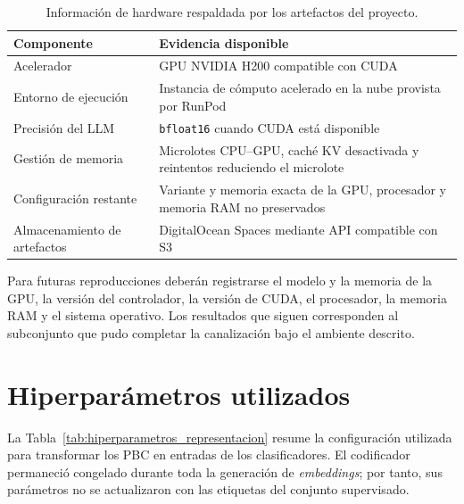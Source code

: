 \begin{table}[H]
\centering
\caption{Información de hardware respaldada por los artefactos del proyecto.}
\label{tab:hardware}
\begin{tabular}{p{4.2cm}p{8.2cm}}
\toprule
\textbf{Componente} & \textbf{Evidencia disponible} \\
\midrule
Acelerador & GPU NVIDIA H200 compatible con CUDA \\
Entorno de ejecución & Instancia de cómputo acelerado en la nube provista por RunPod \\
Precisión del LLM & \texttt{bfloat16} cuando CUDA está disponible \\
Gestión de memoria & Microlotes CPU--GPU, caché KV desactivada y reintentos reduciendo el microlote \\
Configuración restante & Variante y memoria exacta de la GPU, procesador y memoria RAM no preservados \\
Almacenamiento de artefactos & DigitalOcean Spaces mediante API compatible con S3 \\
\bottomrule
\end{tabular}
\end{table}

Para futuras reproducciones deberán registrarse el modelo y la memoria de la GPU, la versión del controlador, la versión de CUDA, el procesador, la memoria RAM y el sistema operativo. Los resultados que siguen corresponden al subconjunto que pudo completar la canalización bajo el ambiente descrito.

\section{Hiperparámetros utilizados}

La Tabla~\ref{tab:hiperparametros_representacion} resume la configuración utilizada para transformar los PBC en entradas de los clasificadores. El codificador permaneció congelado durante toda la generación de \textit{embeddings}; por tanto, sus parámetros no se actualizaron con las etiquetas del conjunto supervisado.

